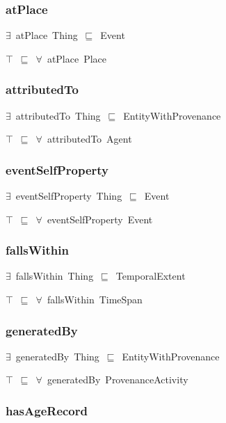 \documentclass{article}
\begin{document}
\subsubsection*{atPlace}

\ensuremath{\exists}~atPlace~Thing~\ensuremath{\sqsubseteq}~Event

\ensuremath{\top}~\ensuremath{\sqsubseteq}~\ensuremath{\forall}~atPlace~Place

\subsubsection*{attributedTo}

\ensuremath{\exists}~attributedTo~Thing~\ensuremath{\sqsubseteq}~EntityWithProvenance

\ensuremath{\top}~\ensuremath{\sqsubseteq}~\ensuremath{\forall}~attributedTo~Agent

\subsubsection*{eventSelfProperty}

\ensuremath{\exists}~eventSelfProperty~Thing~\ensuremath{\sqsubseteq}~Event

\ensuremath{\top}~\ensuremath{\sqsubseteq}~\ensuremath{\forall}~eventSelfProperty~Event

\subsubsection*{fallsWithin}

\ensuremath{\exists}~fallsWithin~Thing~\ensuremath{\sqsubseteq}~TemporalExtent

\ensuremath{\top}~\ensuremath{\sqsubseteq}~\ensuremath{\forall}~fallsWithin~TimeSpan

\subsubsection*{generatedBy}

\ensuremath{\exists}~generatedBy~Thing~\ensuremath{\sqsubseteq}~EntityWithProvenance

\ensuremath{\top}~\ensuremath{\sqsubseteq}~\ensuremath{\forall}~generatedBy~ProvenanceActivity

\subsubsection*{hasAgeRecord}
\end{document}

